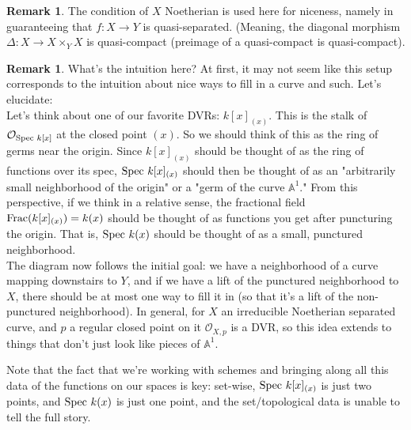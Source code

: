 \documentclass[10pt,reqno]{amsart}
\theoremstyle{definition}
\newtheorem{remark}[theorem]{Remark}
\theoremstyle{remark}
\numberwithin{equation}{section}
\numberwithin{theorem}{section}
\newcommand{\OO}{{\mathcal O}}
\newcommand{\spec}{\textup{Spec }}
\newcommand{\A}{{\mathbb A}}
\begin{document}
\begin{remark} The condition of $X$ Noetherian is used here for niceness, namely in guaranteeing that $f: X \to Y$ is quasi-separated. (Meaning, the diagonal morphism $\Delta: X \to X \times_Y X$ is quasi-compact (preimage of a quasi-compact is quasi-compact).
\end{remark}

\begin{remark} What's the intuition here? At first, it may not seem like this setup corresponds to the intuition about nice ways to fill in a curve and such. Let's elucidate:
\\

Let's think about one of our favorite DVRs: $k[x]_{(x)}$. This is the stalk of $\OO_{\spec k[x]}$ at the closed point $(x)$. So we should think of this as the ring of germs near the origin. Since $k[x]_{(x)}$ should be thought of as the ring of functions over its spec, $\spec k[x]_{(x)}$ should then be thought of as an "arbitrarily small neighborhood of the origin" or a "germ of the curve $\A^1$." From this perspective, if we think in a relative sense, the fractional field $\textup{Frac}(k[x]_{(x)}) = k(x)$ should be thought of as functions you get after puncturing the origin. That is, $\spec k(x)$ should be thought of as a small, punctured neighborhood.
\\

The diagram now follows the initial goal: we have a neighborhood of a curve mapping downstairs to $Y$, and if we have a lift of the punctured neighborhood to $X$, there should be at most one way to fill it in (so that it's a lift of the non-punctured neighborhood). In general, for $X$ an irreducible Noetherian separated curve, and $p$ a regular closed point on it $\OO_{X,p}$ is a DVR, so this idea extends to things that don't just look like pieces of $\A^1$.

Note that the fact that we're working with schemes and bringing along all this data of the functions on our spaces is key: set-wise, $\spec k[x]_{(x)}$ is just two points, and $\spec k(x)$ is just one point, and the set/topological data is unable to tell the full story.
 \end{remark}
 
\end{document}
